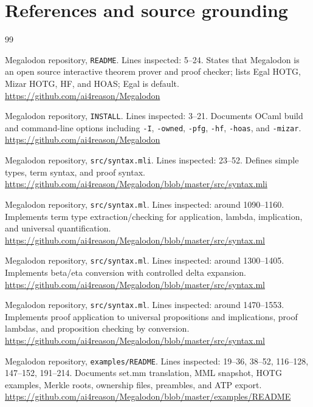 \documentclass[11pt]{article}
\newcommand{\Megalodon}{\textup{Megalodon}}
\newcommand{\HOTG}{\textup{HOTG}}
\newcommand{\code}[1]{\texttt{#1}}
\begin{document}
\section{References and source grounding}

\begin{thebibliography}{99}

\Megalodon{} repository, \code{README}.  Lines inspected: 5--24.  States that \Megalodon{} is an open source interactive theorem prover and proof checker; lists Egal \HOTG{}, Mizar \HOTG{}, HF, and HOAS; Egal is default.  \url{https://github.com/ai4reason/Megalodon}

\Megalodon{} repository, \code{INSTALL}.  Lines inspected: 3--21.  Documents OCaml build and command-line options including \code{-I}, \code{-owned}, \code{-pfg}, \code{-hf}, \code{-hoas}, and \code{-mizar}.  \url{https://github.com/ai4reason/Megalodon}

\Megalodon{} repository, \code{src/syntax.mli}.  Lines inspected: 23--52.  Defines simple types, term syntax, and proof syntax.  \url{https://github.com/ai4reason/Megalodon/blob/master/src/syntax.mli}

\Megalodon{} repository, \code{src/syntax.ml}.  Lines inspected: around 1090--1160.  Implements term type extraction/checking for application, lambda, implication, and universal quantification.  \url{https://github.com/ai4reason/Megalodon/blob/master/src/syntax.ml}

\Megalodon{} repository, \code{src/syntax.ml}.  Lines inspected: around 1300--1405.  Implements beta/eta conversion with controlled delta expansion.  \url{https://github.com/ai4reason/Megalodon/blob/master/src/syntax.ml}

\Megalodon{} repository, \code{src/syntax.ml}.  Lines inspected: around 1470--1553.  Implements proof application to universal propositions and implications, proof lambdas, and proposition checking by conversion.  \url{https://github.com/ai4reason/Megalodon/blob/master/src/syntax.ml}

\Megalodon{} repository, \code{examples/README}.  Lines inspected: 19--36, 38--52, 116--128, 147--152, 191--214.  Documents set.mm translation, MML snapshot, HOTG examples, Merkle roots, ownership files, preambles, and ATP export.  \url{https://github.com/ai4reason/Megalodon/blob/master/examples/README}


\end{thebibliography}
\end{document}
